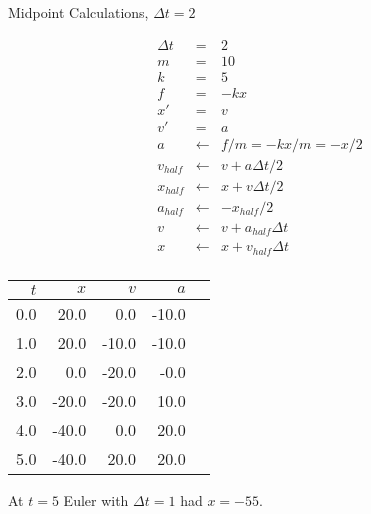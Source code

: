\documentclass{beamer}
\newcommand{\bframe}[1]{\begin{frame}[fragile]{#1}}
\newcommand{\dt}{\Delta t}
\begin{document}
\bframe{Midpoint Calculations, $\dt=2$}
\begin{minipage}{2in}
\begin{eqnarray*}
\dt &=& 2 \\
m &=& 10  \\
k &=& 5   \\
f &=& -kx \\
x' &=& v \\
v' &=& a \\
a &\leftarrow& f/m = -kx/m = -x/2 \\
v_{half} &\leftarrow& v + a\dt/2\\
x_{half} &\leftarrow& x + v\dt/2 \\
a_{half} &\leftarrow& -x_{half}/2 \\
v &\leftarrow& v + a_{half}\dt\\
x &\leftarrow& x + v_{half}\dt\\
\end{eqnarray*}
\end{minipage}\hfill
\begin{minipage}{2in}

\begin{tabular}{r|rrrr}
$t$ & $x$ & $v$ & $a$ \\\hline
0.0  &  20.0  &  0.0  &  -10.0  &  \\
1.0  &  20.0  &  -10.0  &  -10.0  &  \\
2.0  &  0.0  &  -20.0  &  -0.0  &  \\
3.0  &  -20.0  &  -20.0  &  10.0  &  \\
4.0  &  -40.0  &  0.0  &  20.0  &  \\
5.0  &  -40.0  &  20.0  &  20.0  &  \\
\end{tabular}

\end{minipage}

\hfill At $t=5$ Euler with $\dt=1$ had $x=-55$.

\end{frame}
\end{document}
